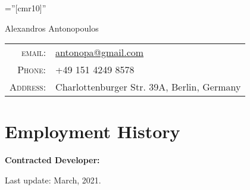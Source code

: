 \documentclass[a4paper,10pt]{article}
\newenvironment{contract_work}
{
    \renewcommand\descriptionlabel[1]{\hspace{\labelsep}{##1,}}

\begin{description}[leftmargin=0cm, labelwidth=0cm, labelsep=0.1cm]
}
{\end{description} }
\begin{document}
\pagestyle{fancyplain}
\renewcommand{\headrulewidth}{0.0pt}
\lhead{}
\chead{}
\rhead{}
\lfoot{}
\cfoot{}
\font\fb=''[cmr10]'' %

\par{\centering
        {\Huge Alexandros Antonopoulos
    }\bigskip\par}

\begin{tabular}{rl}
    \textsc{email:}     & \href{mailto:antonopa@gmail.com}{antonopa@gmail.com} \\
    \textsc{Phone:}     & +49 151 4249 8578\\
    \textsc{Address:}   & Charlottenburger Str. 39A, Berlin, Germany
\end{tabular}

\section{Employment History}
\begin{description}
  
  
  
  
  \item \textbf{Contracted Developer:}
  \begin{contract_work}
    
    
  \end{contract_work}
  
\end{description}





%


\vfill \hfill Last update: March, 2021.
\end{document}
